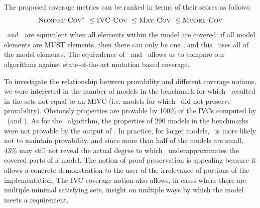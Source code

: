 The proposed coverage metrics can be ranked in terms of their scores as follows:
$$\nondetcovalt\ \leq \ivccov\ \leq \maycov\ \leq \allcov$$
\ivccov\ and \nondetcovalt\ are equivalent when all elements within the model are covered: if all model elements are MUST elements, then there can only be one \mivc , and this \mivc ~uses all of the model elements. The equivalence of \mustcov\ and \nondetcovalt\ allows us to compare our algorithms against state-of-the-art mutation based coverage.

To investigate the relationship between provability and different coverage notions,
we were interested in the number of models in the benchmark for which
\mustalg\ resulted in the sets not equal to an MIVC (i.e. models for which
\mustalg\ did not preserve provability).
Obviously properties are provable by 100\% of the IVCs computed by \ucalg\ (and \ucbfalg).
As for the \mustalg\ algorithm, the properties of 290 models in the benchmarks were not provable by the output of \mustalg. In practice, for larger models, \mustcov\ is more likely not to maintain provability,
 and since more than half of the models are small, 43\% may still not reveal the actual degree
 to which \mustcov\ underapproximates the covered parts of a model.
  The notion of proof preservation is appealing because it allows a concrete demonstration to the user of the irrelevance of portions of the implementation.  The IVC coverage notion also allows, in cases where there are multiple minimal satisfying sets, insight on multiple ways by which the model meets a requirement.


